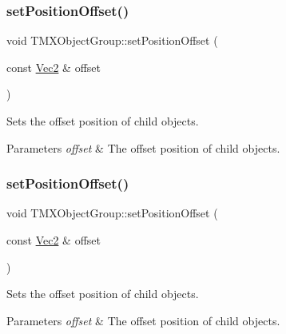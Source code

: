 \subsubsection{\texorpdfstring{set\+Position\+Offset()}{setPositionOffset()}\hspace{0.1cm}{\footnotesize\ttfamily [1/2]}}
{\footnotesize\ttfamily void T\+M\+X\+Object\+Group\+::set\+Position\+Offset (\begin{DoxyParamCaption}\item[{const \hyperlink{classVec2}{Vec2} \&}]{offset }\end{DoxyParamCaption})\hspace{0.3cm}{\ttfamily [inline]}}

Sets the offset position of child objects.


\begin{DoxyParams}{Parameters}
{\em offset} & The offset position of child objects. \\
\hline
\end{DoxyParams}
\mbox{\label{classTMXObjectGroup_a0280a11095c886a5e3f195f40377dd20}} 
\subsubsection{\texorpdfstring{set\+Position\+Offset()}{setPositionOffset()}\hspace{0.1cm}{\footnotesize\ttfamily [2/2]}}
{\footnotesize\ttfamily void T\+M\+X\+Object\+Group\+::set\+Position\+Offset (\begin{DoxyParamCaption}\item[{const \hyperlink{classVec2}{Vec2} \&}]{offset }\end{DoxyParamCaption})\hspace{0.3cm}{\ttfamily [inline]}}

Sets the offset position of child objects.


\begin{DoxyParams}{Parameters}
{\em offset} & The offset position of child objects. \\
\hline
\end{DoxyParams}
\mbox{\label{classTMXObjectGroup_aefd094cfbf8755171cfc69689910b1de}} 
